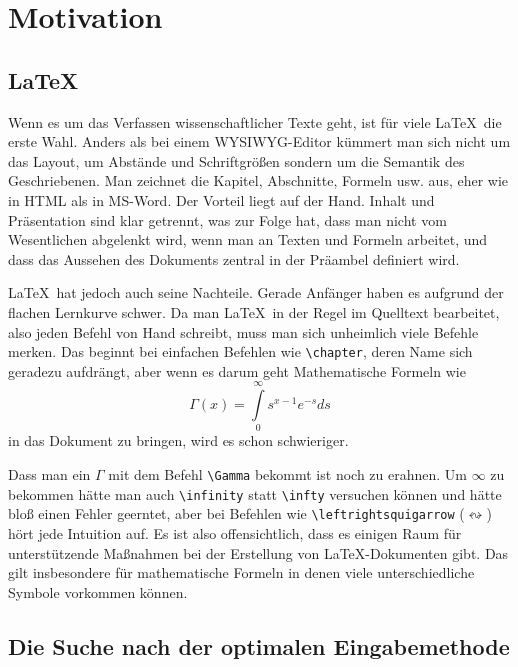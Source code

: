 \chapter{Motivation}

\section{\LaTeX}

Wenn es um das Verfassen wissenschaftlicher Texte geht, ist für viele \LaTeX\ die erste Wahl. Anders als bei einem \ac{WYSIWYG}-Editor kümmert man sich nicht um das Layout, um Abstände und Schriftgrößen sondern um die Semantik des Geschriebenen. Man zeichnet die Kapitel, Abschnitte, Formeln usw. aus, eher wie in \ac{HTML} als in MS-Word. Der Vorteil liegt auf der Hand. Inhalt und Präsentation sind klar getrennt, was zur Folge hat, dass man nicht vom Wesentlichen abgelenkt wird, wenn man an Texten und Formeln arbeitet, und dass das Aussehen des Dokuments zentral in der Präambel definiert wird.

\LaTeX~hat jedoch auch seine Nachteile. Gerade Anfänger haben es aufgrund der flachen Lernkurve schwer. Da man \LaTeX~in der Regel im Quelltext bearbeitet, also jeden Befehl von Hand schreibt, muss man sich unheimlich viele Befehle merken. Das beginnt bei einfachen Befehlen wie \texttt{\textbackslash chapter}, deren Name sich geradezu aufdrängt, aber wenn es darum geht Mathematische Formeln wie $$\Gamma \left( x \right) = \int\limits_0^\infty  {s^{x - 1} e^{ - s} ds}$$ in das Dokument zu bringen, wird es schon schwieriger.

Dass man ein $\Gamma$ mit dem Befehl \texttt{\textbackslash Gamma} bekommt ist noch zu erahnen. Um $\infty$ zu bekommen hätte man auch \texttt{\textbackslash infinity} statt \texttt{\textbackslash infty} versuchen können und hätte bloß einen Fehler geerntet, aber bei Befehlen wie \texttt{\textbackslash leftrightsquigarrow} ($\leftrightsquigarrow$) hört jede Intuition auf. Es ist also offensichtlich, dass es einigen Raum für unterstützende Maßnahmen bei der Erstellung von \LaTeX-Dokumenten gibt. Das gilt insbesondere für mathematische Formeln in denen viele unterschiedliche Symbole vorkommen können.

\section{Die Suche nach der optimalen Eingabemethode}
\label{sec:optimal}

